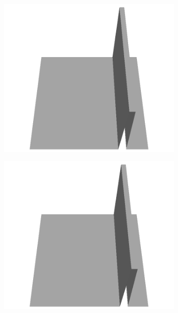\documentclass[../document.tex]{subfiles}
\begin{document}
\begin{figure}[H]
\begin{subfigure}[b]{0.065\textwidth}
    \includegraphics[width=\linewidth]{../img/5/custom_patches/walls_front/all/29-3d.png}
    \end{subfigure}
    \begin{subfigure}[b]{0.065\textwidth}
    \includegraphics[width=\linewidth]{../img/5/custom_patches/walls_front/all/28-3d.png}
    \end{subfigure}
    \begin{subfigure}[b]{0.065\textwidth}

\end{subfigure}
\end{figure}
\end{document}
